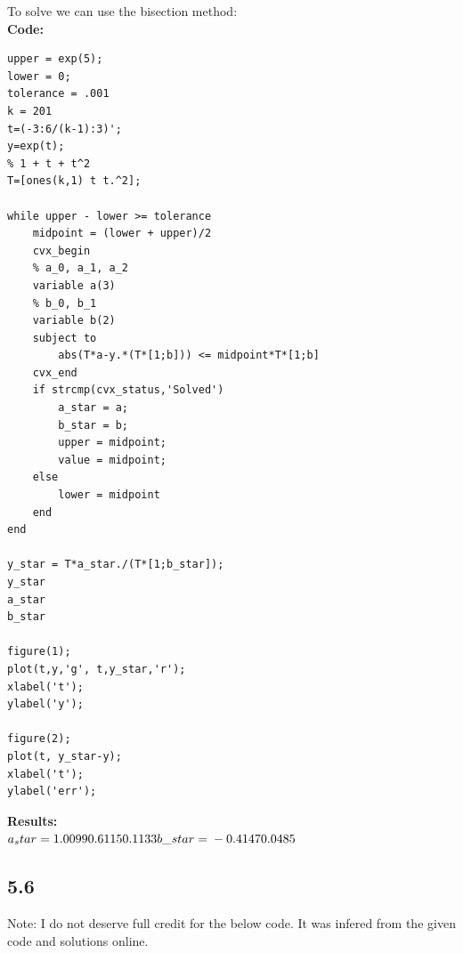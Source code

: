 \documentclass[12pt]{article}
\begin{document}
To solve we can use the bisection method:\\ 
\textbf{Code:}
\begin{lstlisting}
upper = exp(5);
lower = 0;
tolerance = .001
k = 201
t=(-3:6/(k-1):3)';
y=exp(t);
% 1 + t + t^2
T=[ones(k,1) t t.^2];

while upper - lower >= tolerance
    midpoint = (lower + upper)/2
    cvx_begin
    % a_0, a_1, a_2
    variable a(3)
    % b_0, b_1
    variable b(2)
    subject to
        abs(T*a-y.*(T*[1;b])) <= midpoint*T*[1;b]
    cvx_end
    if strcmp(cvx_status,'Solved')
        a_star = a;
        b_star = b;
        upper = midpoint;
        value = midpoint;
    else
        lower = midpoint       
    end
end

y_star = T*a_star./(T*[1;b_star]);
y_star
a_star
b_star

figure(1);
plot(t,y,'g', t,y_star,'r');
xlabel('t');
ylabel('y');

figure(2);
plot(t, y_star-y);
xlabel('t');
ylabel('err');
\end{lstlisting}
\textbf{Results:}\\
$a_star =\\
    1.0099\\
    0.6115\\
    0.1133\\
b\_star =\\
   -0.4147\\
    0.0485\\$
\subsection*{5.6}
Note: I do not deserve full credit for the below code. It was infered from the given code and solutions online.
\end{document}

